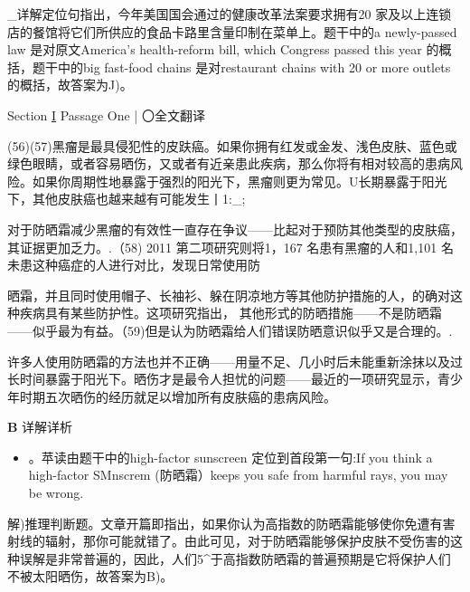 \documentclass[UTF8,11pt]{ctexart}
\begin{document}
\_详解定位句指出，今年美国国会通过的健康改革法案要求拥有20 家及以上连锁店的餐馆将它们所供应的食品卡路里含量印制在菜单上。题干中的a newly-passed law 是对原文America’s health-reform bill, which Congress passed this year 的概括，题干中的big fast-food chains 是对restaurant chains with 20 or more outlets 的概括，故答案为J)。


Section \uline{I} Passage One | 〇全文翻译


(56)(57)黑瘤是最具侵犯性的皮趺癌。如果你拥有红发或金发、浅色皮肤、蓝色或绿色眼睛，或者容易晒伤，又或者有近亲患此疾病，那么你将有相对较高的患病风险。如果你周期性地暴露于强烈的阳光下，黑瘤则更为常见。U长期暴露于阳光下，其他皮肤癌也越来越有可能发生丨1:\_;


对于防晒霜减少黑瘤的有效性一直存在争议——比起对于预防其他类型的皮肤癌，其证据更加乏力。.（58) 2011 第二项研究则将1，167 名患有黑瘤的人和1,101 名未患这种癌症的人进行对比，发现日常使用防


晒霜，并且同时使用帽子、长袖衫、躲在阴凉地方等其他防护措施的人，的确对这种疾病具有某些防护性。这项研究指出， 其他形式的防晒措施——不是防晒霜——似乎最为有益。（59)但是认为防晒霜给人们错误防晒意识似乎又是合理的。.


许多人使用防晒霜的方法也并不正确——用量不足、几小时后未能重新涂抹以及过长时间暴露于阳光下。晒伤才是最令人担忧的问题——最近的一项研究显示，青少年时期五次晒伤的经历就足以增加所有皮肤癌的患病风险。


 \textbf{B} 详解详析


\begin{itemize}[leftmargin=2em,itemsep=.2em,topsep=.4em]\item[B.] 。苹读由题干中的high-factor sunscreen 定位到首段第一句:If you think a high-factor SMnscrem (防晒霜）keeps you safe from harmful rays, you may be wrong.
\end{itemize}

解)推理判断题。文章开篇即指出，如果你认为高指数的防晒霜能够使你免遭有害射线的辐射，那你可能就错了。由此可见，对于防晒霜能够保护皮肤不受伤害的这种误解是非常普遍的，因此，人们5\textasciicircum{}于高指数防晒霜的普遍预期是它将保护人们不被太阳晒伤，故答案为B)。
\end{document}
